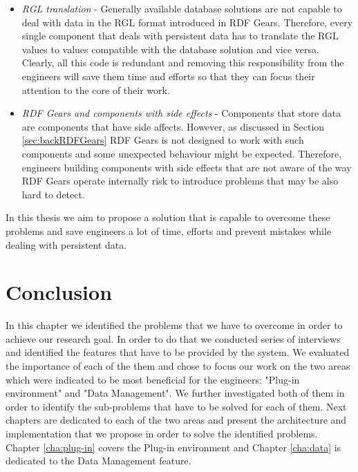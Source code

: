 \begin{itemize}
	\item \textit{RGL translation} - Generally available database solutions are not capable to deal with data in the RGL format introduced in RDF Gears. Therefore, every single component that deals with persistent data has to translate the RGL values to values compatible with the database solution and vice versa. Clearly, all this code is redundant and removing this responsibility from the engineers will save them time and efforts so that they can focus their attention to the core of their work.
	
	\item \textit{RDF Gears and components with side effects} - Components that store data are components that have side affects. However, as discussed in Section \ref{sec:backRDFGears} RDF Gears is not designed to work with such components and some unexpected behaviour might be expected. Therefore, engineers building components with side effects that are not aware of the way RDF Gears operate internally risk to introduce problems that may be also hard to detect.
	
\end{itemize}

In this thesis we aim to propose a solution that is capable to overcome these problems and save engineers a lot of time, efforts and prevent mistakes while dealing with persistent data.

\section{Conclusion}

In this chapter we identified the problems that we have to overcome in order to achieve our research goal. In order to do that we conducted series of interviews and identified the features that have to be provided by the system. We evaluated the importance of each of the them and chose to focus our work on the two areas which were indicated to be most beneficial for the engineers: "Plug-in environment" and "Data Management". We further investigated both of them in order to identify the sub-problems that have to be solved for each of them. Next chapters are dedicated to each of the two areas and present the architecture and implementation that we propose in order to solve the identified problems. Chapter \ref{cha:plug-in} covers the Plug-in environment and Chapter \ref{cha:data} is dedicated to the Data Management feature.